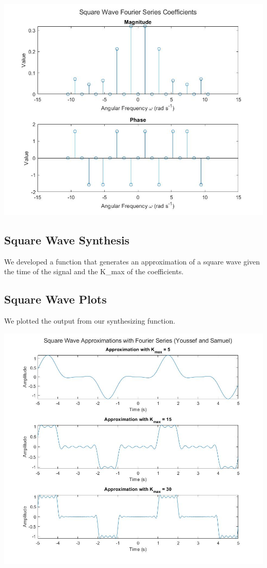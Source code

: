 \documentclass[11pt]{article}
\begin{document}
\includegraphics[width=\textwidth]{ck_values.png}



\subsection{Square Wave Synthesis}

We developed a function that generates an approximation of a square wave
given the time of the signal and the K\_{max} of the coefficients.



\subsection{Square Wave Plots}

We plotted the output from our synthesizing function.

\includegraphics[width=\textwidth]{squarewaves.png}
\end{document}
